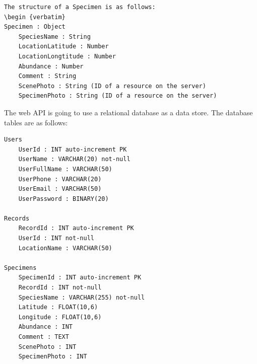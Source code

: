 \begin {verbatim}
The structure of a Specimen is as follows:
\begin {verbatim}
Specimen : Object
    SpeciesName : String
    LocationLatitude : Number
    LocationLongtitude : Number
    Abundance : Number
    Comment : String
    ScenePhoto : String (ID of a resource on the server)
    SpecimenPhoto : String (ID of a resource on the server)
\end {verbatim}

The web API is going to use a relational database as a data store.
The database tables are as follows:

\begin {verbatim}
Users
    UserId : INT auto-increment PK
    UserName : VARCHAR(20) not-null
    UserFullName : VARCHAR(50)
    UserPhone : VARCHAR(20)
    UserEmail : VARCHAR(50)
    UserPassword : BINARY(20)
    
Records
    RecordId : INT auto-increment PK
    UserId : INT not-null
    LocationName : VARCHAR(50)
    
Specimens
    SpecimenId : INT auto-increment PK
    RecordId : INT not-null
    SpeciesName : VARCHAR(255) not-null
    Latitude : FLOAT(10,6)
    Longitude : FLOAT(10,6)
    Abundance : INT
    Comment : TEXT
    ScenePhoto : INT
    SpecimenPhoto : INT   
\end {verbatim}